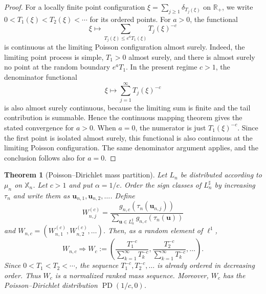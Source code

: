 \documentclass[a4paper,12pt]{article}
\newtheorem{thm}{Theorem}
\theoremstyle{definition}
\theoremstyle{remark}
\newcommand{\re}{\mathbb R}
\newcommand{\PD}{\operatorname{PD}}
\begin{document}
\begin{proof}
For a locally finite point configuration
$\xi=\sum_{j\geq 1}\delta_{T_j(\xi)}$ on $\re_+$, we write
$0<T_1(\xi)<T_2(\xi)<\cdots$ for its ordered points.
For $a>0$, the functional
$$
\xi\mapsto
\sum_{T_j(\xi)\leq e^a T_1(\xi)}
T_j(\xi)^{-c}
$$
is continuous at the limiting Poisson configuration almost surely.
Indeed, the limiting point process is simple, $T_1>0$ almost surely,
and there is almost surely no point at the random boundary $e^aT_1$.
In the present regime $c>1$, the denominator functional
$$
\xi\mapsto \sum_{j=1}^{\infty}T_j(\xi)^{-c}
$$
is also almost surely continuous, because the limiting sum is finite and
the tail contribution is summable.
Hence the continuous mapping theorem gives the stated convergence for
$a>0$.
%
When $a=0$, the numerator is just $T_1(\xi)^{-c}$.
Since the first point is isolated almost surely, this functional is also
continuous at the limiting Poisson configuration.
The same denominator argument applies, and the conclusion follows also
for $a=0$.
\end{proof}

\begin{thm}[Poisson--Dirichlet mass partition]
\label{thm:pd}
Let $L_n$ be distributed according to $\mu_n$ on $\mathbb X_n$.
Let $c>1$ and put $\alpha=1/c$.
Order the sign classes of $L_n^\sharp$ by increasing $\tau_n$ and write them as $\bm u_{n,1},\bm u_{n,2},\ldots$.
Define
$$
W_{n,j}^{(c)}=
\frac{g_{n,c}(\tau_n(\bm u_{n,j}))}
{\sum_{\bm u\in L_n^\sharp}g_{n,c}(\tau_n(\bm u))}
$$
and $W_{n,c}=(W_{n,1}^{(c)},W_{n,2}^{(c)},\ldots)$.
Then, as a random element of $\ell^1$,
$$
W_{n,c}\Rightarrow W_c:=
\left(
\frac{T_1^{-c}}{\sum_{k=1}^{\infty}T_k^{-c}},
\frac{T_2^{-c}}{\sum_{k=1}^{\infty}T_k^{-c}},
\ldots
\right).
$$
Since $0<T_1<T_2<\cdots$, the sequence
$T_1^{-c},T_2^{-c},\ldots$ is already ordered in decreasing order.
Thus $W_c$ is a normalized ranked mass sequence.
Moreover, $W_c$ has the Poisson--Dirichlet distribution $\PD(1/c,0)$.
\end{thm}
\end{document}
